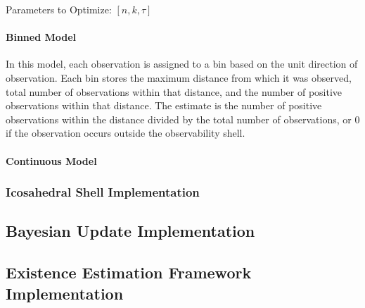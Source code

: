 Parameters to Optimize: $[n, k, \tau]$

\paragraph{Binned Model}

In this model, each observation is assigned to a bin based on the unit direction of observation. Each bin stores the maximum distance from which it was observed, total number of observations within that distance, and the number of positive observations within that distance. The estimate is the number of positive observations within the distance divided by the total number of observations, or 0 if the observation occurs outside the observability shell.

\paragraph{Continuous Model}

\subsubsection{Icosahedral Shell Implementation}
\label{sec:icos_construction}

\subsection{Bayesian Update Implementation}
\label{sec:existence_confidence}

\subsection{Existence Estimation Framework Implementation}